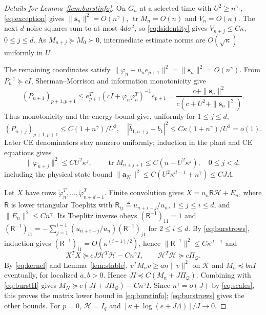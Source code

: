 \documentclass[11pt,reqno]{amsart}
\numberwithin{equation}{section}
\theoremstyle{definition}
\theoremstyle{remark}
\newcommand{\ph}{\varphi}
\newcommand{\phc}{\check{\varphi}}
\newcommand{\tr}{\operatorname{tr}}
\begin{document}
\begin{proof}[Details for Lemma~\ref{lem:burstinfo}]
On $G_n$ at a selected time with $U^2\ge n^{\gamma_1}$, \eqref{eq:exception} gives $\|\mathbf s_n\|^2=O(n^\gamma)$, $\tr M_n=O(n)$ and $V_n=O(\kappa)$. The next $d$ noise squares sum to at most $4d\sigma^2$, so \eqref{eq:lsidentity} gives $V_{n+j}\le C\kappa$, $0\le j\le d$. As $M_{n+j}\succeq M_0\succ0$, intermediate estimate norms are $O(\sqrt\kappa)$ uniformly in $U$.

The remaining coordinates satisfy $\|\ph_n-u_ne_{p+1}\|^2=\|\mathbf s_n\|^2=O(n^\gamma)$.
From $P_n^{-1}\succeq cI$, Sherman--Morrison and information monotonicity give
\[
 (P_{n+1})_{p+1,p+1}
 \le e_{p+1}^T(cI+\ph_n\ph_n^T)^{-1}e_{p+1}
 =\frac{c+\|\mathbf s_n\|^2}{c(c+U^2+\|\mathbf s_n\|^2)}.
\]
Thus monotonicity and the energy bound give, uniformly for $1\le j\le d$,
\begin{equation*}
 (P_{n+j})_{p+1,p+1}\le C(1+n^\gamma)/U^2,
 \quad |\widehat b_{1,n+j}-b_1|^2\le C\kappa(1+n^\gamma)/U^2=o(1).
\end{equation*}
Later CE denominators stay nonzero uniformly; induction in the plant and CE equations gives
\begin{equation}\label{eq:burstrows}
 \|\phc_{n+j}\|^2\le C U^2\kappa^j,
 \qquad\tr M_{n+j+1}\le C(n+U^2\kappa^j),\quad0\le j<d,
\end{equation}
including the physical state bound $\|\mathbf a_N\|^2\le C(U^2\kappa^{d-1}+n^\gamma)
\le CJ\Lambda$.

Let $X$ have rows $\phc_n^T,\ldots,\phc_{n+d-1}^T$. Finite convolution gives $X=u_n\mathsf R\mathcal H+E_n$, where $\mathsf R$ is lower triangular Toeplitz with $\mathsf R_{ij}\triangleq u_{n+i-j}/u_n$, $1\le j\le i\le d$, and $\|E_n\|^2\le Cn^\gamma$. Its Toeplitz inverse obeys $(\mathsf R^{-1})_{11}=1$ and $(\mathsf R^{-1})_{i1}=-\sum_{j=1}^{i-1}(u_{n+i-j}/u_n)(\mathsf R^{-1})_{j1}$ for $2\le i\le d$. By \eqref{eq:burstrows}, induction gives $(\mathsf R^{-1})_{i1}=O(\kappa^{(i-1)/2})$, hence $\|\mathsf R^{-1}\|^2\le C\kappa^{d-1}$ and
\begin{equation}\label{eq:burstH}
 X^T X\succeq cJ\mathcal H^T\mathcal H-Cn^\gamma I,
 \qquad \mathcal H^T\mathcal H\succeq c\Pi_{\mathcal Q}.
\end{equation}
By \eqref{eq:kernel} and Lemma~\ref{lem:stable}, $v^T M_nv\ge an\|v\|^2$ on $\mathcal K$ and $M_n\preceq bnI$ eventually, for localized $a,b>0$. Hence $\underline J I\preceq C(M_n+J\Pi_{\mathcal Q})$. Combining with \eqref{eq:burstH} gives
$M_N\succeq c(\underline J I+J\Pi_{\mathcal Q})-Cn^\gamma I$.
Since $n^\gamma=o(\underline J)$ by \eqref{eq:scales}, this proves the matrix lower bound in \eqref{eq:burstinfo}; \eqref{eq:burstrows} gives the other bounds. For $p=0$, $\mathcal H=I_q$ and $[\kappa+\log(e+J\Lambda)]/J\to0$.
\end{proof}
\end{document}

